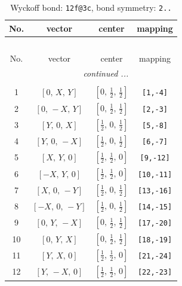 \documentclass[fleqn,8pt]{jsarticle}
\begin{document}
\renewcommand{\arraystretch}{1.2}
\begin{longtable}{cccc}
\caption{Wyckoff bond: {\tt 12f@3c}, bond symmetry: {\tt 2..}}
 \\
 \hline \hline
No. & vector & center & mapping \\ \hline \endfirsthead

\multicolumn{3}{l}{\tablename\ \thetable{}} \\
 \hline \hline
No. & vector & center & mapping \\ \hline \endhead

 \hline \hline
\multicolumn{3}{r}{\footnotesize\it continued ...} \\ \endfoot

 \hline \hline
\multicolumn{3}{r}{} \\ \endlastfoot

1 & $\left[ 0,\, X,\, Y \right]$ & $\left[ 0,\, \frac{1}{2},\, \frac{1}{2} \right]$ & {\tt [1,-4]} \\ \hline
2 & $\left[ 0,\, - X,\, Y \right]$ & $\left[ 0,\, \frac{1}{2},\, \frac{1}{2} \right]$ & {\tt [2,-3]} \\ \hline
3 & $\left[ Y,\, 0,\, X \right]$ & $\left[ \frac{1}{2},\, 0,\, \frac{1}{2} \right]$ & {\tt [5,-8]} \\ \hline
4 & $\left[ Y,\, 0,\, - X \right]$ & $\left[ \frac{1}{2},\, 0,\, \frac{1}{2} \right]$ & {\tt [6,-7]} \\ \hline
5 & $\left[ X,\, Y,\, 0 \right]$ & $\left[ \frac{1}{2},\, \frac{1}{2},\, 0 \right]$ & {\tt [9,-12]} \\ \hline
6 & $\left[ - X,\, Y,\, 0 \right]$ & $\left[ \frac{1}{2},\, \frac{1}{2},\, 0 \right]$ & {\tt [10,-11]} \\ \hline
7 & $\left[ X,\, 0,\, - Y \right]$ & $\left[ \frac{1}{2},\, 0,\, \frac{1}{2} \right]$ & {\tt [13,-16]} \\ \hline
8 & $\left[ - X,\, 0,\, - Y \right]$ & $\left[ \frac{1}{2},\, 0,\, \frac{1}{2} \right]$ & {\tt [14,-15]} \\ \hline
9 & $\left[ 0,\, Y,\, - X \right]$ & $\left[ 0,\, \frac{1}{2},\, \frac{1}{2} \right]$ & {\tt [17,-20]} \\ \hline
10 & $\left[ 0,\, Y,\, X \right]$ & $\left[ 0,\, \frac{1}{2},\, \frac{1}{2} \right]$ & {\tt [18,-19]} \\ \hline
11 & $\left[ Y,\, X,\, 0 \right]$ & $\left[ \frac{1}{2},\, \frac{1}{2},\, 0 \right]$ & {\tt [21,-24]} \\ \hline
12 & $\left[ Y,\, - X,\, 0 \right]$ & $\left[ \frac{1}{2},\, \frac{1}{2},\, 0 \right]$ & {\tt [22,-23]} \\
\end{longtable}
\end{document}
